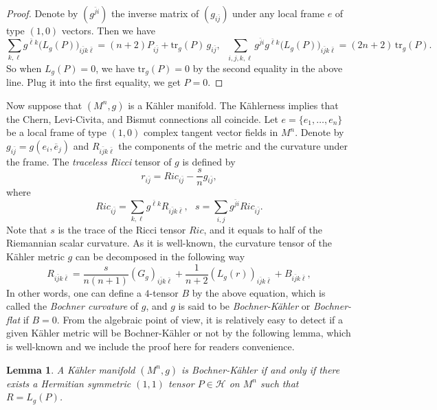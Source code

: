 \documentclass{amsart}
\newtheorem{lemma}{Lemma}
\numberwithin{equation}{section}
\begin{document}
\begin{proof}
Denote by $(g^{\bar{j}i})$ the inverse matrix of $(g_{i\bar{j}})$ under any local frame $e$ of type $(1,0)$ vectors. Then we have
$$ \sum_{k,\ell} g^{\bar{\ell}k} \big(L_g(P)\big)_{i\bar{j}k\bar{\ell}} = (n+2)P_{i\bar{j}} + \mbox{tr}_g(P)\,g_{i\bar{j}}, \ \ \,  \sum_{i,j,k,\ell} g^{\bar{j}i}g^{\bar{\ell}k} \big(L_g(P)\big)_{i\bar{j}k\bar{\ell}} = (2n+2)\,\mbox{tr}_g(P).$$
So when $L_g(P)=0$, we have $\mbox{tr}_g(P)=0$ by the second equality in the above line. Plug it into the first equality, we get $P=0$.
\end{proof}



Now suppose that $(M^n,g)$ is a K\"ahler manifold. The K\"ahlerness implies that the Chern, Levi-Civita, and Bismut connections all coincide.
Let $e=\{ e_1, \ldots , e_n\}$ be a local frame of type $(1,0)$ complex tangent vector fields in $M^n$. Denote by $g_{i\bar{j}}=g(e_i, \overline{e}_j)$ and $R_{i\bar{j}k\bar{\ell}}$ the components of the metric and the curvature under the frame. The {\em traceless Ricci} tensor of $g$ is defined by
$$  r_{i\bar{j}} = Ric_{i\bar{j}} - \frac{s}{n}g_{i\bar{j}}, $$
where
$$ Ric_{i\bar{j}} = \sum_{k,\ell} g^{\bar{\ell }k} R_{i\bar{j}k\bar{\ell}}, \ \ \ s=\sum_{i,j} g^{\bar{j}i} Ric_{i\bar{j}}. $$
Note that $s$ is the trace of the Ricci tensor $Ric$, and it equals to half of the Riemannian scalar curvature.
As it is well-known, the curvature tensor of the K\"ahler metric $g$ can be decomposed in the following way
\begin{equation} \label{eq:decom}
R_{i\bar{j}k\bar{\ell}} =  \frac{s}{n(n+1)} (G_g)_{i\bar{j}k\bar{\ell}} + \frac{1}{n+2} (L_g(r))_{i\bar{j}k\bar{\ell}} + B_{i\bar{j}k\bar{\ell}} ,
\end{equation}
In other words, one can define a $4$-tensor $B$ by the above equation, which is called the {\em Bochner curvature} of $g$, and $g$ is said to be {\em Bochner-K\"ahler} or {\em Bochner-flat} if $B=0$. From the algebraic point of view, it is relatively easy to detect if a given K\"ahler metric will be Bochner-K\"ahler or not by the following lemma, which is  well-known and we include the proof here for readers convenience.

\begin{lemma} \label{lemma3}
A K\"ahler manifold $(M^n,g)$ is Bochner-K\"ahler if and only if there exists a Hermitian symmetric $(1,1)$ tensor $P\in {\mathcal H}$ on $M^n$ such that $R=L_g(P)$.
\end{lemma}
\end{document}
